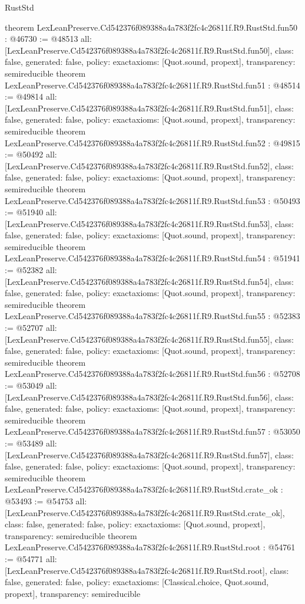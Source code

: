 \begin{lexlean}{RustStd}
\begin{coremodule}
{}
theorem LexLeanPreserve.Cd542376f089388a4a783f2fc4c26811f.R9.RustStd.fun50 : @46730 := @48513 {
  all: [LexLeanPreserve.Cd542376f089388a4a783f2fc4c26811f.R9.RustStd.fun50],
  class: false,
  generated: false,
  policy: exact{axioms: [Quot.sound, propext]},
  transparency: semireducible
}
theorem LexLeanPreserve.Cd542376f089388a4a783f2fc4c26811f.R9.RustStd.fun51 : @48514 := @49814 {
  all: [LexLeanPreserve.Cd542376f089388a4a783f2fc4c26811f.R9.RustStd.fun51],
  class: false,
  generated: false,
  policy: exact{axioms: [Quot.sound, propext]},
  transparency: semireducible
}
theorem LexLeanPreserve.Cd542376f089388a4a783f2fc4c26811f.R9.RustStd.fun52 : @49815 := @50492 {
  all: [LexLeanPreserve.Cd542376f089388a4a783f2fc4c26811f.R9.RustStd.fun52],
  class: false,
  generated: false,
  policy: exact{axioms: [Quot.sound, propext]},
  transparency: semireducible
}
theorem LexLeanPreserve.Cd542376f089388a4a783f2fc4c26811f.R9.RustStd.fun53 : @50493 := @51940 {
  all: [LexLeanPreserve.Cd542376f089388a4a783f2fc4c26811f.R9.RustStd.fun53],
  class: false,
  generated: false,
  policy: exact{axioms: [Quot.sound, propext]},
  transparency: semireducible
}
theorem LexLeanPreserve.Cd542376f089388a4a783f2fc4c26811f.R9.RustStd.fun54 : @51941 := @52382 {
  all: [LexLeanPreserve.Cd542376f089388a4a783f2fc4c26811f.R9.RustStd.fun54],
  class: false,
  generated: false,
  policy: exact{axioms: [Quot.sound, propext]},
  transparency: semireducible
}
theorem LexLeanPreserve.Cd542376f089388a4a783f2fc4c26811f.R9.RustStd.fun55 : @52383 := @52707 {
  all: [LexLeanPreserve.Cd542376f089388a4a783f2fc4c26811f.R9.RustStd.fun55],
  class: false,
  generated: false,
  policy: exact{axioms: [Quot.sound, propext]},
  transparency: semireducible
}
theorem LexLeanPreserve.Cd542376f089388a4a783f2fc4c26811f.R9.RustStd.fun56 : @52708 := @53049 {
  all: [LexLeanPreserve.Cd542376f089388a4a783f2fc4c26811f.R9.RustStd.fun56],
  class: false,
  generated: false,
  policy: exact{axioms: [Quot.sound, propext]},
  transparency: semireducible
}
theorem LexLeanPreserve.Cd542376f089388a4a783f2fc4c26811f.R9.RustStd.fun57 : @53050 := @53489 {
  all: [LexLeanPreserve.Cd542376f089388a4a783f2fc4c26811f.R9.RustStd.fun57],
  class: false,
  generated: false,
  policy: exact{axioms: [Quot.sound, propext]},
  transparency: semireducible
}
theorem LexLeanPreserve.Cd542376f089388a4a783f2fc4c26811f.R9.RustStd.crate_ok : @53493 := @54753 {
  all: [LexLeanPreserve.Cd542376f089388a4a783f2fc4c26811f.R9.RustStd.crate_ok],
  class: false,
  generated: false,
  policy: exact{axioms: [Quot.sound, propext]},
  transparency: semireducible
}
theorem LexLeanPreserve.Cd542376f089388a4a783f2fc4c26811f.R9.RustStd.root : @54761 := @54771 {
  all: [LexLeanPreserve.Cd542376f089388a4a783f2fc4c26811f.R9.RustStd.root],
  class: false,
  generated: false,
  policy: exact{axioms: [Classical.choice, Quot.sound, propext]},
  transparency: semireducible
}


\end{coremodule}
\end{lexlean}
